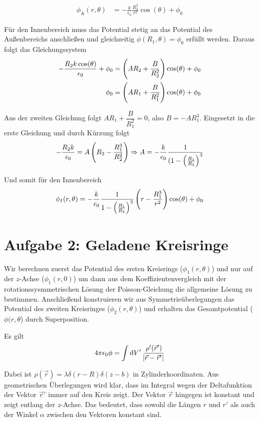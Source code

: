 \documentclass[a4paper,german,12pt,smallheadings]{scrartcl}
\begin{document}
\begin{align*}
  \phi_\text{A}(r,\theta) &= -\frac{k}{\epsilon_0} \frac{R_2^3}{r^2} \cos(\theta) + \phi_0
\end{align*}

Für den Innenbereich muss das Potential stetig an das Potential des
Außenbereichs anschließen und gleichzeitig $\phi(R_1,\theta) = \phi_0$ erfüllt
werden. Daraus folgt das Gleichungssystem
\begin{align*}
  -\frac{R_2 k \cos(\theta)}{\epsilon_0} + \phi_0 &= \del{AR_2 + \frac{B}{R_2^2}} \cos(\theta) + \phi_0 \\
                                           \phi_0 &= \del{AR_1 + \frac{B}{R_1^2}} \cos(\theta) + \phi_0
\end{align*}

Aus der zweiten Gleichung folgt $AR_1 + \dfrac{B}{R_1^2} = 0$, also $B =
-AR_1^3$. Eingesetzt in die erste Gleichung und durch Kürzung folgt
\begin{equation}
  -\frac{R_2 k}{\epsilon_0} = A \del{R_2 - \frac{R_1^3}{R_2^2}} \Rightarrow
  A = -\frac{k}{\epsilon_0} \frac{1}{(1- \del{\frac{R_1}{R_2}}^3}
\end{equation}

Und somit für den Innenbereich
\begin{equation}
  \phi_I(r, \theta) = -\frac{k}{\epsilon_0} \frac{1}{1-\del{\frac{R_1}{R_2}}^3} \del{r - \frac{R_1^3}{r^2}} \cos(\theta) + \phi_0
\end{equation}

\section*{Aufgabe 2: Geladene Kreisringe}
Wir berechnen zuerst das Potential des ersten Kreisrings ($\phi_1(r,\theta)$)
und nur auf der $z$-Achse ($\phi_1(r,0)$) um dann aus dem
Koeffizientenvergleich mit der rotationssysmmetrischen Lösung der
Poisson-Gleichung die allgemeine Lösung zu bestimmen. Anschließend konstruieren
wir aus Symmetrieüberlegungen das Potential des zweiten Kreisringes ($\phi_2(r,
\theta)$) und erhalten das Gesamtpotential ($\phi(r,\theta$) durch
Superposition.

Es gilt
\begin{equation}
  4 \pi \epsilon_0 \phi = \int \dif V' \; \frac{\rho'(\vec{r}')}{\envert{\vec{r} - \vec{r}'}}
\end{equation}

Dabei ist $\rho(\vec{r}) = \lambda \delta(r-R) \delta(z-b)$ in
Zylinderkoordinaten. Aus geometrischen Überlegungen wird klar, dass im Integral
wegen der Deltafunktion der Vektor $\vec{r}'$ immer auf den Kreis zeigt. Der
Vektor $\vec{r}$ hingegen ist konstant und zeigt entlang der $z$-Achse. Das
bedeutet, dass sowohl die Längen $r$ und $r'$ als auch der Winkel $\alpha$
zwischen den Vektoren konstant sind.
\end{document}
